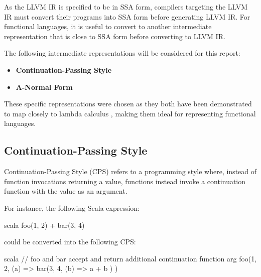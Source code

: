 As the LLVM IR is specified to be in SSA form, compilers targeting the LLVM IR must convert their
programs into SSA form before generating LLVM IR. For functional languages, it is useful to convert
to another intermediate representation that is close to SSA form before converting to LLVM IR.

The following intermediate representations will be considered for this report:
\begin{itemize}
    \onehalfspacing
    \item \textbf{Continuation-Passing Style}
    \item \textbf{A-Normal Form}
\end{itemize}

These specific representations were chosen as they both have been demonstrated to map closely to
lambda calculus \autocite{morrisett1999systemf,flanagan1993essence}, making them ideal for
representing functional languages.

\subsection{Continuation-Passing Style}
\label{sec:cps}

Continuation-Passing Style (CPS) refers to a programming style where, instead of function
invocations returning a value, functions instead invoke a continuation function with the value as
an argument.


For instance, the following Scala expression:

\begin{code}{scala}
    foo(1, 2) + bar(3, 4)
\end{code}

\noindent could be converted into the following CPS:

\begin{code}{scala}
    // foo and bar accept and return additional continuation function arg
    foo(1, 2,
        (a) => bar(3, 4,
            (b) => a + b
        )
    )
\end{code}

